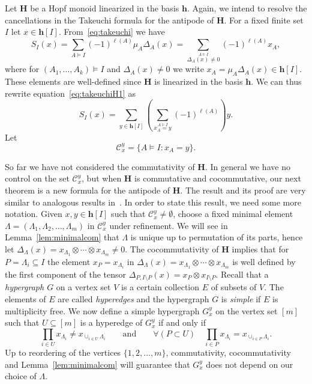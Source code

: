\documentclass[ALCO,ThmDefs,Unicode,epreuves]{cedram}
\newcommand{\bH}{\mathbf{H}}
\newcommand{\bh}{\mathbf{h}}
\begin{document}
Let $\bH$ be a Hopf monoid linearized in the basis $\bh$. 
Again, we intend to resolve the cancellations in the Takeuchi formula for the antipode of $\bH$. For a fixed finite set $I$ let $x\in \bh[I]$. 
From~\eqref{eq:takeuchi} we have
\begin{equation}\label{eq:takeuchiH1}
 S_I(x) = \sum_{A\models I} (-1)^{\ell(A)} \mu_A \Delta_A(x)
 = \sum_{\stackrel{A\models I } %
 {\Delta_A(x)\ne 0}} (-1)^{\ell(A)} x_A,
\end{equation}
 where for $(A_1,\ldots,A_k)\models I$ 
and $\Delta_A(x)\ne 0$ we write $x_A=\mu_A\Delta_A(x) \in \bh[I].$
These elements are well-defined since $\bH$ is linearized in the basis $\bh$. 
We can thus rewrite equation~\eqref{eq:takeuchiH1} as 
\begin{equation}\label{eq:takeuchiH2}
 S_I(x) = \sum_{y\in \bh[I]}\left(\sum_{\stackrel{A\models I } %
 {x_A=y}} (-1)^{\ell(A)}\right) y.
\end{equation}
Let 
 $$\mathcal{C}_{x}^{y}=\big\{A\models I : x_A=y\big\}.$$

So far we have not considered the commutativity of $\bH$. In general we have no control on the set $\mathcal{C}_{x}^{y}$, but when $\bH$ is commutative and cocommutative,
our next theorem is a new formula for the antipode of $\bH$. The result and its proof are very similar to analogous results in~\cite{Benedetti-Sagan,Bergeron-Ceballos}.
In order to state this result, we need some more notation. Given $x,y\in \bh[I]$ such that $\mathcal{C}_{x}^{y}\ne \emptyset$, choose a fixed minimal element $\Lambda=(\Lambda_1,\Lambda_2,\ldots,\Lambda_m)$ in $\mathcal{C}_{x}^{y}$ under refinement. We will see in Lemma~\ref{lem:minimalcom} that $\Lambda$ is unique up to permutation of its parts, hence let $\Delta_\Lambda(x)=x_{\Lambda_1}\otimes\cdots\otimes x_{\Lambda_m}\ne 0$. 
The cocommutativity of $\bH$ implies that for $P=\Lambda_i\subseteq I$ the element $x_P=x_{\Lambda_i}$ in 
$\Delta_\Lambda(x)=x_{\Lambda_1}\otimes\cdots\otimes x_{\Lambda_m}$ is well defined by the first component of the tensor $\Delta_{P,I\setminus P}(x)=x_P\otimes x_{I\setminus P}$.
Recall that a \emph{hypergraph $G$} on a vertex set $V$ is a certain collection $E$ of subsets of $V$. The elements of $E$ are called \emph{hyperedges} and the hypergraph $G$ is \emph{simple} if $E$ is multiplicity free. We now define a simple hypergraph $G_x^y$ on the vertex set $[m]$ 
such that $U\subseteq [m]$ is a hyperedge of $G_x^y$ if and only if
 \begin{equation}\label{eq:Gcom}
 \prod_{i\in U} x_{\Lambda_i} \ne x_{\cup_{i\in U} \Lambda_i}
 \qquad \text{and}\qquad \forall(P\subset U)\quad \prod_{i\in P} x_{\Lambda_i} = x_{\cup_{i\in P} \Lambda_i} .
 \end{equation}
Up to reordering of the vertices $\{1,2,\ldots,m\}$, commutativity, cocommutativity and Lemma~\ref{lem:minimalcom} will guarantee that $G_x^y$ does not depend on our choice of $\Lambda$.
\end{document}
